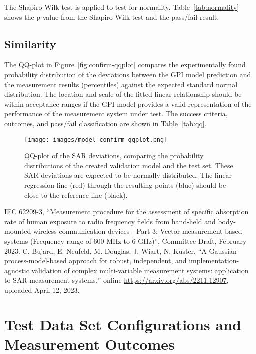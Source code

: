 \documentclass{article}
\begin{document}
The Shapiro-Wilk test is applied to test for normality. Table~\ref{tab:normality} shows the p-value from the Shapiro-Wilk test and the pass/fail result.



\FloatBarrier
\subsection{Similarity}

The QQ-plot in Figure~\ref{fig:confirm-qqplot} compares the experimentally found probability distribution of the deviations between the GPI model prediction and the measurement results (percentiles) against the expected standard normal distribution. The location and scale of the fitted linear relationship should be within acceptance ranges if the GPI model provides a valid representation of the performance of the measurement system under test. The success criteria, outcomes, and pass/fail classification are shown in Table~\ref{tab:qq}.



\begin{figure} \centering
\texttt{[image: images/model-confirm-qqplot.png]}
\caption{QQ-plot of the SAR deviations, comparing the probability distributions of the created validation model and the test set. These SAR deviations are expected to be normally distributed. The linear regression line (red) through the resulting points (blue) should be close to the reference line (black).}
\end{figure}

\FloatBarrier
\begin{thebibliography}{9}
IEC 62209-3, ``Measurement procedure for the assessment of specific absorption rate of human exposure to radio frequency fields from hand-held and body-mounted wireless communication devices - Part 3: Vector measurement-based systems (Frequency range of 600 MHz to 6 GHz)'', Committee Draft, February 2023.
C. Bujard, E. Neufeld, M. Douglas, J. Wiart, N. Kuster, ``A Gaussian-process-model-based approach for robust, independent, and implementation-agnostic validation of complex multi-variable measurement systems: application to SAR measurement systems,'' online \url{https://arxiv.org/abs/2211.12907}, uploaded April 12, 2023.
\end{thebibliography}

\FloatBarrier
\newpage
\appendix
\section{Test Data Set Configurations and Measurement Outcomes} \label{sec:test-data}


\end{document}
